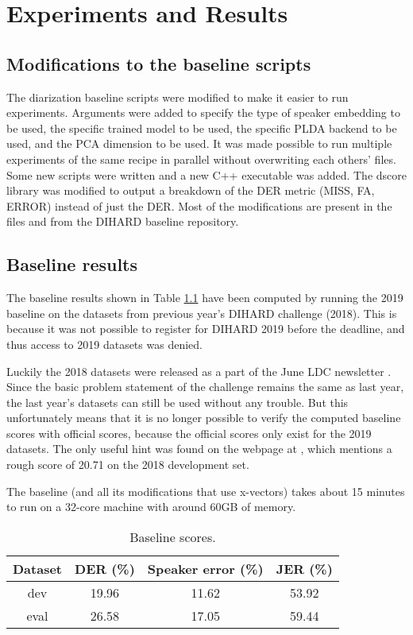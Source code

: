 \chapter{Experiments and Results}
	\section{Modifications to the baseline scripts}
	The diarization baseline scripts were modified to make it easier to run experiments. Arguments were added to specify the type of speaker embedding to be used, the specific trained model to be used, the specific PLDA backend to be used, and the PCA dimension to be used. It was made possible to run multiple experiments of the same recipe in parallel without overwriting each others' files. Some new scripts were written and a new C++ executable was added. The dscore library was modified to output a breakdown of the DER metric (MISS, FA, ERROR) instead of just the DER. Most of the modifications are present in the files  and  from the DIHARD baseline repository.
	
	\section{Baseline results}
	The baseline results shown in Table \ref{table-baseline-scores} have been computed by running the 2019 baseline on the datasets from previous year's DIHARD challenge (2018). This is because it was not possible to register for DIHARD 2019 before the deadline, and thus access to 2019 datasets was denied.
	
	Luckily the 2018 datasets were released as a part of the June LDC newsletter \cite{ldc-news-june}. Since the basic problem statement of the challenge remains the same as last year, the last year's datasets can still be used without any trouble. But this unfortunately means that it is no longer possible to verify the computed baseline scores with official scores, because the official scores only exist for the 2019 datasets. The only useful hint was found on the webpage at \cite{dihard2-unofficial}, which mentions a rough score of 20.71 on the 2018 development set.
	
	The baseline (and all its modifications that use x-vectors) takes about 15 minutes to run on a 32-core machine with around 60GB of memory.
	
	\begin{table}[h]
		\centering
		\begin{tabular}{|c|c|c|c|}
			\hline
			Dataset & DER (\%) & Speaker error (\%) & JER (\%) \\
			\hline
			dev & 19.96 & 11.62 & 53.92 \\
			\hline
			eval & 26.58 & 17.05 & 59.44 \\
			\hline
		\end{tabular}
	\caption{Baseline scores.}
	\label{table-baseline-scores}
	\end{table}
	

